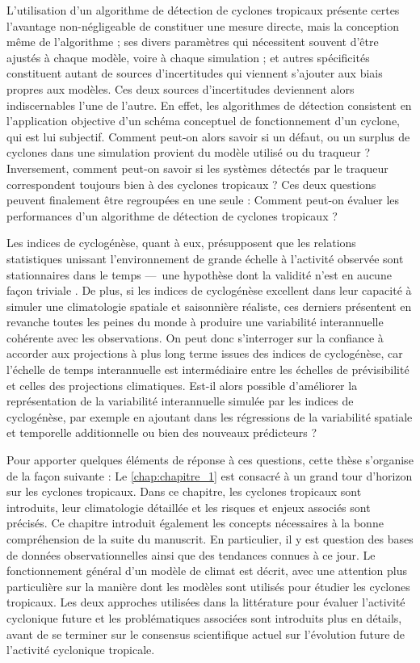 \documentclass[../main.tex]{subfiles}
\begin{document}
L'utilisation d'un algorithme de détection de cyclones tropicaux présente certes l'avantage non-négligeable de constituer une mesure directe, mais la conception
même de l'algorithme ; ses divers paramètres qui nécessitent souvent d'être ajustés à chaque modèle, voire à chaque simulation ; et autres spécificités
constituent autant de sources d'incertitudes qui viennent s'ajouter aux biais propres aux modèles. Ces deux sources d'incertitudes deviennent alors
indiscernables l'une de l'autre. En effet, les algorithmes de détection consistent en l'application objective d'un schéma conceptuel de fonctionnement d'un
cyclone, qui est lui subjectif. Comment peut-on alors savoir si un défaut, ou un surplus de cyclones dans une simulation provient du modèle utilisé ou du
traqueur ? Inversement, comment peut-on savoir si les systèmes détectés par le traqueur correspondent toujours bien à des cyclones tropicaux ? Ces deux
questions peuvent finalement être regroupées en une seule : Comment peut-on évaluer les performances d'un algorithme de détection de cyclones tropicaux ?

Les indices de cyclogénèse, quant à eux, présupposent que les relations statistiques unissant l'environnement de grande échelle à l'activité observée sont
stationnaires dans le temps ---~une hypothèse dont la validité n'est en aucune façon triviale \parencite{nolan_increased_2008,murakami_changes_2013}. De plus,
si les indices de cyclogénèse excellent dans leur capacité à simuler une climatologie spatiale et saisonnière réaliste, ces derniers présentent en revanche
toutes les peines du monde à produire une variabilité interannuelle cohérente avec les observations. On peut donc s'interroger sur la confiance à accorder aux
projections à plus long terme issues des indices de cyclogénèse, car l'échelle de temps interannuelle est intermédiaire entre les échelles de
prévisibilité et celles des projections climatiques. Est-il alors possible d'améliorer la représentation de la variabilité interannuelle simulée par les indices
de cyclogénèse, par exemple en ajoutant dans les régressions de la variabilité spatiale et temporelle additionnelle ou bien des nouveaux prédicteurs ?

Pour apporter quelques éléments de réponse à ces questions, cette thèse s'organise de la façon suivante : Le \cref{chap:chapitre_1} est consacré à un grand tour
d'horizon sur les cyclones tropicaux. Dans ce chapitre, les cyclones tropicaux sont introduits, leur climatologie détaillée et les risques et enjeux associés
sont précisés. Ce chapitre introduit également les concepts nécessaires à la bonne compréhension de la suite du manuscrit. En particulier, il y est question des
bases de données observationnelles ainsi que des tendances connues à ce jour. Le fonctionnement général d'un modèle de climat est décrit, avec une attention
plus particulière sur la manière dont les modèles sont utilisés pour étudier les cyclones tropicaux. Les deux approches utilisées dans la littérature pour
évaluer l'activité cyclonique future et les problématiques associées sont introduits plus en détails, avant de se terminer sur le consensus scientifique actuel
sur l'évolution future de l'activité cyclonique tropicale.
\end{document}

